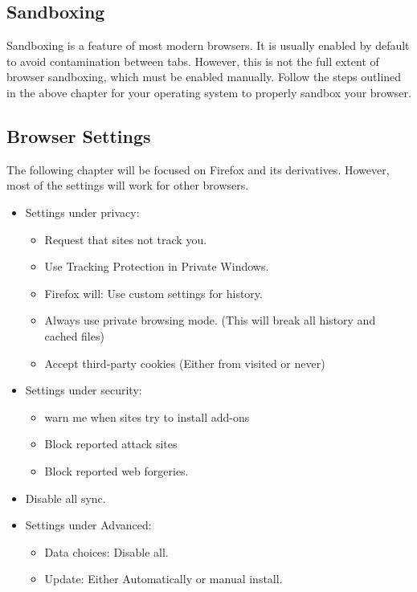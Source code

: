 		\subsection{Sandboxing}
			Sandboxing is a feature of most modern browsers. It is usually enabled by default to avoid contamination between tabs.
			However, this is not the full extent of browser sandboxing, which must be enabled manually.
			Follow the steps outlined in the above chapter for your operating system to properly sandbox your browser.
		\subsection{Browser Settings}
			The following chapter will be focused on Firefox and its derivatives.
			However, most of the settings will work for other browsers.
			\begin{itemize}
				\item Settings under privacy:
					\begin{itemize}
						\item Request that sites not track you.
						\item Use Tracking Protection in Private Windows.
						\item Firefox will: Use custom settings for history.
						\item Always use private browsing mode. (This will break all history and cached files)
						\item Accept third-party cookies (Either from visited or never)
					\end{itemize}
				\item Settings under security:
					\begin{itemize}
						\item warn me when sites try to install add-ons
						\item Block reported attack sites
						\item Block reported web forgeries.
					\end{itemize}
				\item Disable all sync.
				\item Settings under Advanced:
					\begin{itemize}
						\item Data choices: Disable all.
						\item Update: Either Automatically or manual install.
					\end{itemize}
			\end{itemize}
